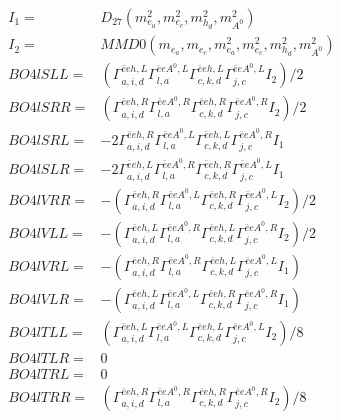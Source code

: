\documentclass[A4,landscape]{article}
\begin{document}
\begin{align} 
I_1 = & D_{27}(m^2_{e_{{a}}}, m^2_{e_{{c}}}, m^2_{h_{{d}}}, m^2_{A^0}) \\ 
I_2 = & MMD0(m_{e_{{a}}}, m_{e_{{c}}}, m^2_{e_{{a}}}, m^2_{e_{{c}}}, m^2_{h_{{d}}}, m^2_{A^0}) \\ 
  BO4lSLL= & ( \Gamma^{\bar{e}e h ,L}_{a, i, d} \Gamma^{\bar{e}e A^0 ,L}_{l, a} \Gamma^{\bar{e}e h ,L}_{c, k, d} \Gamma^{\bar{e}e A^0 ,L}_{j, c} I_2)/2 \\ 
  BO4lSRR= & ( \Gamma^{\bar{e}e h ,R}_{a, i, d} \Gamma^{\bar{e}e A^0 ,R}_{l, a} \Gamma^{\bar{e}e h ,R}_{c, k, d} \Gamma^{\bar{e}e A^0 ,R}_{j, c} I_2)/2 \\ 
  BO4lSRL= & -2  \Gamma^{\bar{e}e h ,R}_{a, i, d} \Gamma^{\bar{e}e A^0 ,L}_{l, a} \Gamma^{\bar{e}e h ,L}_{c, k, d} \Gamma^{\bar{e}e A^0 ,R}_{j, c} I_1 \\ 
  BO4lSLR= & -2  \Gamma^{\bar{e}e h ,L}_{a, i, d} \Gamma^{\bar{e}e A^0 ,R}_{l, a} \Gamma^{\bar{e}e h ,R}_{c, k, d} \Gamma^{\bar{e}e A^0 ,L}_{j, c} I_1 \\ 
  BO4lVRR= & -( \Gamma^{\bar{e}e h ,R}_{a, i, d} \Gamma^{\bar{e}e A^0 ,L}_{l, a} \Gamma^{\bar{e}e h ,R}_{c, k, d} \Gamma^{\bar{e}e A^0 ,L}_{j, c} I_2)/2 \\ 
  BO4lVLL= & -( \Gamma^{\bar{e}e h ,L}_{a, i, d} \Gamma^{\bar{e}e A^0 ,R}_{l, a} \Gamma^{\bar{e}e h ,L}_{c, k, d} \Gamma^{\bar{e}e A^0 ,R}_{j, c} I_2)/2 \\ 
  BO4lVRL= & -( \Gamma^{\bar{e}e h ,R}_{a, i, d} \Gamma^{\bar{e}e A^0 ,R}_{l, a} \Gamma^{\bar{e}e h ,L}_{c, k, d} \Gamma^{\bar{e}e A^0 ,L}_{j, c} I_1) \\ 
  BO4lVLR= & -( \Gamma^{\bar{e}e h ,L}_{a, i, d} \Gamma^{\bar{e}e A^0 ,L}_{l, a} \Gamma^{\bar{e}e h ,R}_{c, k, d} \Gamma^{\bar{e}e A^0 ,R}_{j, c} I_1) \\ 
  BO4lTLL= & ( \Gamma^{\bar{e}e h ,L}_{a, i, d} \Gamma^{\bar{e}e A^0 ,L}_{l, a} \Gamma^{\bar{e}e h ,L}_{c, k, d} \Gamma^{\bar{e}e A^0 ,L}_{j, c} I_2)/8 \\ 
  BO4lTLR= & 0 \\ 
  BO4lTRL= & 0 \\ 
  BO4lTRR= & ( \Gamma^{\bar{e}e h ,R}_{a, i, d} \Gamma^{\bar{e}e A^0 ,R}_{l, a} \Gamma^{\bar{e}e h ,R}_{c, k, d} \Gamma^{\bar{e}e A^0 ,R}_{j, c} I_2)/8 \\ 
\end{align} 
\end{document}
